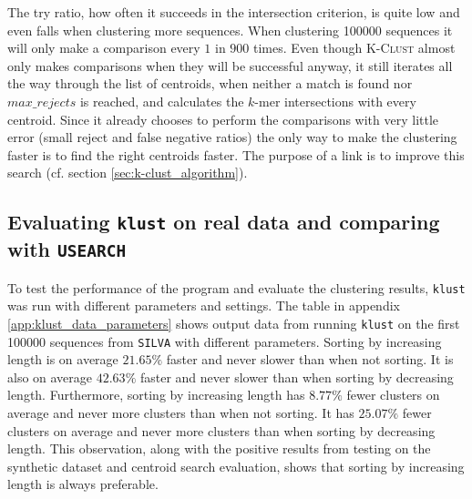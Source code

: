 The try ratio, how often it succeeds in the intersection criterion, is quite
low and even falls when clustering more sequences. When clustering \num{100000}
sequences it will only make a comparison every $1$ in $900$ times. Even though
\textsc{K-Clust} almost only makes comparisons when they will be successful
anyway, it still iterates all the way through the list of centroids, when
neither a match is found nor $max\_rejects$ is reached, and calculates the
$k$-mer intersections with every centroid.  Since it already chooses to perform
the comparisons with very little error (small reject and false negative ratios)
the only way to make the clustering faster is to find the right centroids
faster. The purpose of a link is to improve this search (cf. section
\ref{sec:k-clust_algorithm}).


\subsection{Evaluating \texttt{klust} on real data and comparing with
            \texttt{USEARCH}}
\label{sec:evaluating_klust_real_data}

To test the performance of the program and evaluate the clustering results,
\texttt{klust} was run with different parameters and settings. The table in
appendix \ref{app:klust_data_parameters} shows output data from running
\texttt{klust} on the first \num{100000} sequences from \texttt{SILVA} with
different parameters. Sorting by increasing length is on average $21.65\%$
faster and never slower than when not sorting. It is also on average $42.63\%$
faster and never slower than when sorting by decreasing length. Furthermore,
sorting by increasing length has $8.77\%$ fewer clusters on average and never
more clusters than when not sorting. It has $25.07\%$ fewer clusters on average
and never more clusters than when sorting by decreasing length. This
observation, along with the positive results from testing on the synthetic
dataset and centroid search evaluation, shows that sorting by increasing
length is always preferable.

